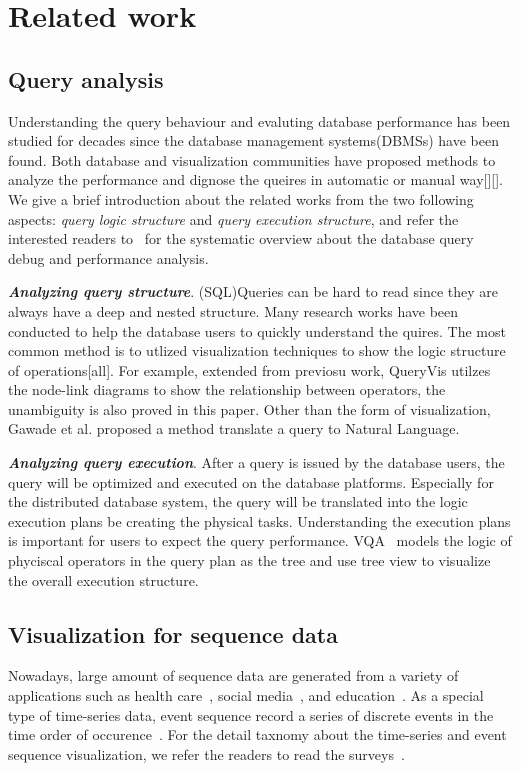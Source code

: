 \section{Related work}
\subsection{Query analysis}
Understanding the query behaviour and evaluting database performance has been studied for decades since the database management systems(DBMSs) have been found. Both database and visualization communities have proposed methods to analyze the performance and dignose the queires in automatic or manual way[][]. We give a brief introduction about the related works from the two following aspects: \textit{query logic structure} and \textit{query execution structure}, and refer the interested readers to~\cite{gathani2020debugging} for the systematic overview about the database query debug and performance analysis.

\emph{\textbf{Analyzing query structure}}. (SQL)Queries can be hard to read since they are always have a deep and nested structure. Many research works have been conducted to help the database users to quickly understand the quires. The most common method is to utlized visualization techniques to show the logic structure of operations[all]. For example, extended from previosu work, QueryVis utilzes the node-link diagrams to show the relationship between operators, the unambiguity is also proved in this paper. Other than the form of visualization, Gawade et al. proposed a method translate a query to Natural Language.  

\emph{\textbf{Analyzing query execution}}. 
After a query is issued by the database users, the query will be optimized and executed on the database platforms. Especially for the distributed database system, the query will be translated into the logic execution plans be creating the physical tasks. Understanding the execution plans is important for users to expect the query performance. VQA~\cite{simitsis2014vqa} models the logic of phyciscal operators in the query plan as the tree and use tree view to visualize the overall execution structure.

\subsection{Visualization for sequence data}
Nowadays, large amount of sequence data are generated from a variety of applications such as health care~\cite{malik2015cohort, wongsuphasawat2011outflow}, social media~\cite{zhao2014fluxflow, law2018maqui}, and education~\cite{chen2015peakvizor, mu2019moocad, goulden2019ccvis, he2019vuc, chen2018viseq}.
As a special type of time-series data, event sequence record a series of discrete events in the time order of occurence~\cite{guo2020survey}. For the detail taxnomy about the time-series and event sequence visualization, we refer the readers to read the surveys~\cite{guo2020survey, silva2000visualization}. 

